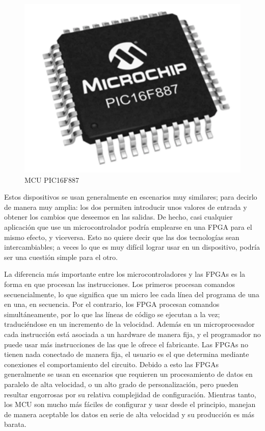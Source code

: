 \begin{figure}[H]
	\center
	\includegraphics[scale=0.6]{imagenes/Herramientas/MCU.png}
	\caption{MCU PIC16F887}
	\label{fig:MCU PIC16F887}
\end{figure}


Estos dispositivos se usan generalmente en escenarios muy similares; para decirlo de manera muy amplia: los dos permiten introducir unos valores de entrada y obtener los cambios que deseemos en las salidas. De hecho, casi cualquier aplicación que use un microcontrolador podría emplearse en una FPGA para el mismo efecto, y viceversa. Esto no quiere decir que las dos tecnologías sean intercambiables; a veces lo que es muy difícil lograr usar en un dispositivo, podría ser una cuestión simple para el otro.\newline 

La diferencia más importante entre los microcontroladores y las FPGAs es la forma en que procesan las instrucciones. Los primeros  procesan comandos secuencialmente, lo que significa que un micro lee cada línea del programa de una en una, en secuencia. Por el contrario, los FPGA procesan comandos simultáneamente, por lo que las líneas de código se ejecutan a la vez; traduciéndose en un incremento de la velocidad. Además en un microprocesador cada instrucción está asociada a un hardware de manera fija, y el programador no puede usar más instrucciones de las que le ofrece el fabricante. Las FPGAs no tienen nada conectado de manera fija, el usuario es el que determina mediante conexiones el comportamiento del circuito. \newline
Debido a esto las FPGAs generalmente se usan en escenarios que requieren un procesamiento de datos en paralelo de alta velocidad, o un alto grado de personalización, pero pueden resultar engorrosas por su relativa complejidad de configuración. Mientras tanto, los MCU son mucho más fáciles de configurar y usar desde el principio, manejan de manera aceptable los datos en serie de alta velocidad y su producción es más barata. \newline

